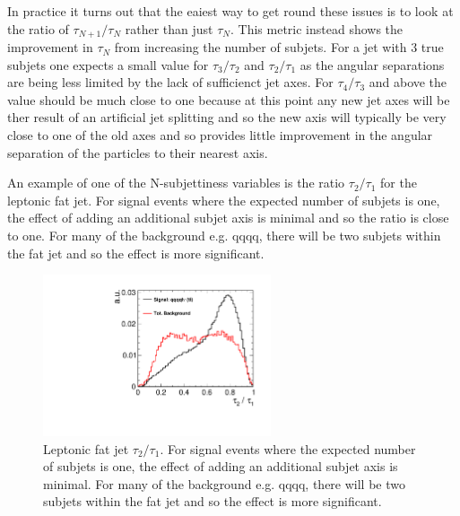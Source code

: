 In practice it turns out that the eaiest way to get round these issues is to look at the ratio of $\tau_{N+1}/\tau_N$ rather than just $\tau_N$. This metric instead shows the improvement in $\tau_N$ from increasing the number of subjets. For a jet with 3 true subjets one expects a small value for $\tau_{3}/\tau_2$ and $\tau_{2}/\tau_1$ as the angular separations are being less limited by the lack of sufficienct jet axes. For $\tau_{4}/\tau_3$ and above the value should be much close to one because at this point any new jet axes will be ther result of an artificial jet splitting and so the new axis will typically be very close to one of the old axes and so provides little improvement in the angular separation of the particles to their nearest axis.

An example of one of the N-subjettiness variables is the ratio $\tau_{2}/\tau_1$ for the leptonic fat jet. For signal events where the expected number of subjets is one, the effect of adding an additional subjet axis is minimal and so the ratio is close to one. For many of the background e.g. qqqq, there will be two subjets within the fat jet and so the effect is more significant.

\begin{figure}
  \centering
  \includegraphics[width=0.6\textwidth]{TopAnalysis/figures/NSubJettiness.pdf}
  \caption[Leptonic fat jet $\tau_{2}/\tau_1$]{Leptonic fat jet $\tau_{2}/\tau_1$. For signal events where the expected number of subjets is one, the effect of adding an additional subjet axis is minimal. For many of the background e.g. qqqq, there will be two subjets within the fat jet and so the effect is more significant.}
  \label{fig:lepfatjetsubjet}
\end{figure}

  
